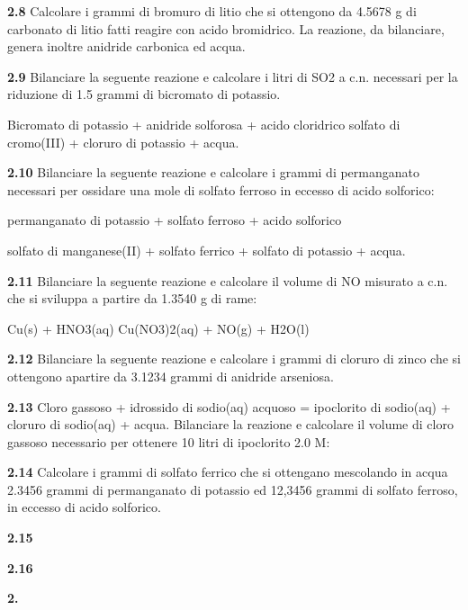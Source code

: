 \vspace{0.2cm}\textbf{2.8} Calcolare i grammi di bromuro di litio che si ottengono da 4.5678 g di carbonato di litio fatti
reagire con acido bromidrico. La reazione, da bilanciare, genera inoltre anidride carbonica ed acqua.

\vspace{0.2cm}\textbf{2.9} Bilanciare la seguente reazione e calcolare i litri di SO2 a c.n. necessari per la riduzione di 1.5
grammi di bicromato di potassio.

Bicromato di potassio + anidride solforosa + acido cloridrico \ce{->} solfato di cromo(III) + cloruro di
potassio + acqua.

\vspace{0.2cm}\textbf{2.10} Bilanciare la seguente reazione e calcolare i grammi di permanganato necessari per ossidare una
mole di solfato ferroso in eccesso di acido solforico:

\begin{center}
permanganato di potassio + solfato ferroso + acido solforico \ce{->}

\ce{->}solfato di manganese(II) + solfato ferrico + solfato di potassio + acqua.
\end{center}

\vspace{0.2cm}\textbf{2.11} Bilanciare la seguente reazione e calcolare il volume di NO misurato a c.n. che si sviluppa a
partire da 1.3540 g di rame:

\begin{center}
Cu(s) + HNO3(aq) \ce{->} Cu(NO3)2(aq) + NO(g) + H2O(l)
\end{center}

\vspace{0.2cm}\textbf{2.12} Bilanciare la seguente reazione e calcolare i grammi di cloruro di zinco che si ottengono apartire da 3.1234 grammi di anidride arseniosa.
\begin{center}
\end{center}

\vspace{0.2cm}\textbf{2.13} Cloro gassoso + idrossido di sodio(aq) acquoso = ipoclorito di sodio(aq) + cloruro di sodio(aq) + acqua.
Bilanciare la reazione e calcolare il volume di cloro gassoso necessario per ottenere 10 litri di ipoclorito 2.0 M:


\vspace{0.2cm}\textbf{2.14} Calcolare i grammi di solfato ferrico che si ottengano mescolando in acqua 2.3456 grammi di permanganato di potassio  ed 12,3456 grammi di solfato ferroso, in eccesso di acido solforico.

\vspace{0.2cm}\textbf{2.15} 

\vspace{0.2cm}\textbf{2.16} 

\vspace{0.2cm}\textbf{2.} 